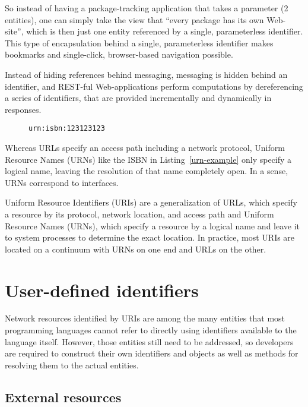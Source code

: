 \documentclass[preprint,authoryear]{acm_proc_article-sp}
\begin{document}
So instead of having
a package-tracking application that takes a parameter (2 entities),
one can simply take the view that ``every package has its own 
Web-site'', which is then just one entity referenced by a single,
parameterless identifier.  This type of encapsulation behind
a single, parameterless identifier makes bookmarks and single-click,
browser-based navigation possible.


Instead of hiding references behind messaging,
messaging is hidden behind an identifier, and REST-ful Web-applications
perform computations by dereferencing a series of identifiers, that 
are provided incrementally and dynamically in responses.


\begin{figure}[htbp]
\begin{lstlisting}[style=L,label=urn-example,caption=A Uniform Resource Name.]
urn:isbn:123123123
\end{lstlisting}
\end{figure}

Whereas URLs specify an access path including a network protocol, Uniform 
Resource Names (URNs) like the ISBN in Listing~\ref{urn-example} only specify a logical
name, leaving the resolution of that name completely open.  In a sense, URNs
correspond to interfaces.

Uniform Resource Identifiers (URIs) are a generalization of URLs, which specify a
resource by its protocol, network location, and access path and Uniform Resource Names (URNs),
which specify
a resource by a logical name and leave it to system processes to 
determine the exact location.  In practice, most URIs are located on
a continuum with URNs on one end and URLs on the other.


\section{User-defined identifiers}
\label{user-defined-identifiers}

Network resources identified by URIs are among the many entities that most
programming languages cannot refer to directly using identifiers available to the
language itself.
However, those entities still need to be addressed, so developers are required
to construct their own identifiers  and objects as well as methods for resolving them to the actual
entities.

\subsection{External resources}
\end{document}
